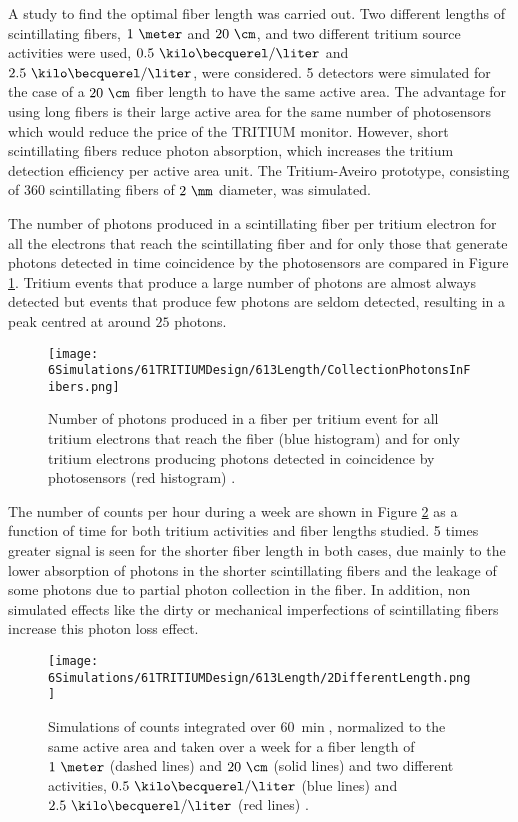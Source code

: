 A study to find the optimal fiber length was carried out. Two different lengths of scintillating fibers, $1~\meter$ and $20~\cm$, and two different tritium source activities were used, $0.5~\kilo\becquerel/\liter$ and $2.5~\kilo\becquerel/\liter$, were considered. 5 detectors were simulated for the case of a $20~\cm$ fiber length to have the same active area. The advantage for using long fibers is their large active area for the same number of photosensors which would reduce the price of the TRITIUM monitor. However, short scintillating fibers reduce photon absorption, which increases the tritium detection efficiency per active area unit. The Tritium-Aveiro prototype, consisting of $360$ scintillating fibers of $2~\mm$ diameter, was simulated. 

The number of photons produced in a scintillating fiber per tritium electron for all the electrons that reach the scintillating fiber and for only those that generate photons detected in time coincidence by the photosensors are compared in Figure \ref{fig:PhotonsFibersYesNoPhotosensors}. Tritium events that produce a large number of photons are almost always detected but events that produce few photons are seldom detected, resulting in a peak centred at around $25$ photons.  

\begin{figure}[h]
\centering
\texttt{[image: 6Simulations/61TRITIUMDesign/613Length/CollectionPhotonsInFibers.png]}
\caption{Number of photons produced in a fiber per tritium event for all tritium electrons that reach the fiber (blue histogram) and for only tritium electrons producing photons detected in coincidence by photosensors (red histogram) \cite{SimulationPaperCarlos}.\label{fig:PhotonsFibersYesNoPhotosensors}}
\end{figure}


The number of counts per hour during a week are shown in Figure \ref{fig:CountsOver60minDifferentLength} as a function of time for both tritium activities and fiber lengths studied. 5 times greater signal is seen for the shorter fiber length in both cases, due mainly to the lower absorption of photons in the shorter scintillating fibers and the leakage of some photons due to partial photon collection in the fiber. In addition, non simulated effects like the dirty or mechanical imperfections of scintillating fibers increase this photon loss effect.

\begin{figure}[h]
\centering
\texttt{[image: 6Simulations/61TRITIUMDesign/613Length/2DifferentLength.png]}
\caption{Simulations of counts integrated over $60~\min$, normalized to the same active area and taken over a week for a fiber length of $1~\meter$ (dashed lines) and $20~\cm$ (solid lines) and two different activities, $0.5~\kilo\becquerel/\liter$ (blue lines) and $2.5~\kilo\becquerel/\liter$ (red lines) \cite{SimulationPaperCarlos}. \label{fig:CountsOver60minDifferentLength}}
\end{figure}

